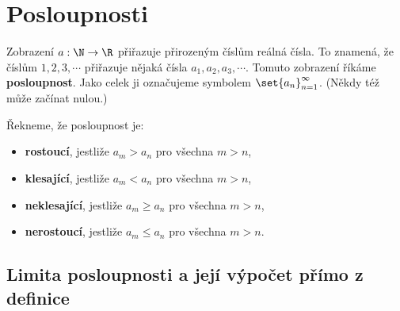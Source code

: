 \section*{Posloupnosti}

Zobrazení $a: \N \to \R$ přiřazuje přirozeným číslům reálná čísla. To znamená, že číslům $1,2,3,\cdots$ přiřazuje nějaká čísla $a_1, a_2, a_3, \cdots$. Tomuto zobrazení říkáme \textbf{posloupnost}. Jako celek ji označujeme symbolem $\set{a_n}_{n=1}^\infty$. (Někdy též může začínat nulou.)

Řekneme, že posloupnost je:
\begin{itemize}
    \item \textbf{rostoucí}, jestliže $a_{m} > a_n$ pro všechna $m>n$,
    \item \textbf{klesající}, jestliže $a_{m} < a_n$ pro všechna $m>n$,
    \item \textbf{neklesající}, jestliže $a_{m} \geq a_n$ pro všechna $m>n$,
    \item \textbf{nerostoucí}, jestliže $a_{m} \leq a_n$ pro všechna $m>n$.
\end{itemize}

\subsection*{Limita posloupnosti a její výpočet přímo z definice}


